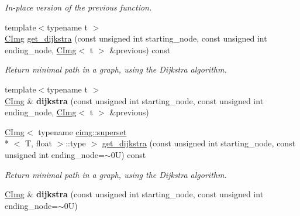 \begin{DoxyCompactItemize}
\begin{DoxyCompactList}\small\item\em In-\/place version of the previous function. \end{DoxyCompactList}\item 
{\footnotesize template$<$typename t $>$ }\\\hyperlink{structcimg__library_1_1_c_img}{C\-Img} \hyperlink{structcimg__library_1_1_c_img_abd17f00cb1ecf969673b00c0091be75d}{get\-\_\-dijkstra} (const unsigned int starting\-\_\-node, const unsigned int ending\-\_\-node, \hyperlink{structcimg__library_1_1_c_img}{C\-Img}$<$ t $>$ \&previous) const 
\begin{DoxyCompactList}\small\item\em Return minimal path in a graph, using the Dijkstra algorithm. \end{DoxyCompactList}\item 
\hypertarget{structcimg__library_1_1_c_img_af16a040c86567fdf63f2b595c1fe5025}{{\footnotesize template$<$typename t $>$ }\\\hyperlink{structcimg__library_1_1_c_img}{C\-Img} \& {\bfseries dijkstra} (const unsigned int starting\-\_\-node, const unsigned int ending\-\_\-node, \hyperlink{structcimg__library_1_1_c_img}{C\-Img}$<$ t $>$ \&previous)}\label{structcimg__library_1_1_c_img_af16a040c86567fdf63f2b595c1fe5025}

\item 
\hypertarget{structcimg__library_1_1_c_img_a495101832ef3e37865421c7af50d33cf}{\hyperlink{structcimg__library_1_1_c_img}{C\-Img}$<$ typename \hyperlink{structcimg__library_1_1cimg_1_1superset}{cimg\-::superset}\\*
$<$ T, float $>$\-::type $>$ \hyperlink{structcimg__library_1_1_c_img_a495101832ef3e37865421c7af50d33cf}{get\-\_\-dijkstra} (const unsigned int starting\-\_\-node, const unsigned int ending\-\_\-node=$\sim$0\-U) const }\label{structcimg__library_1_1_c_img_a495101832ef3e37865421c7af50d33cf}

\begin{DoxyCompactList}\small\item\em Return minimal path in a graph, using the Dijkstra algorithm. \end{DoxyCompactList}\item 
\hypertarget{structcimg__library_1_1_c_img_a717a76076ac753bde6670116398adcd6}{\hyperlink{structcimg__library_1_1_c_img}{C\-Img} \& {\bfseries dijkstra} (const unsigned int starting\-\_\-node, const unsigned int ending\-\_\-node=$\sim$0\-U)}\label{structcimg__library_1_1_c_img_a717a76076ac753bde6670116398adcd6}


\end{DoxyCompactItemize}

